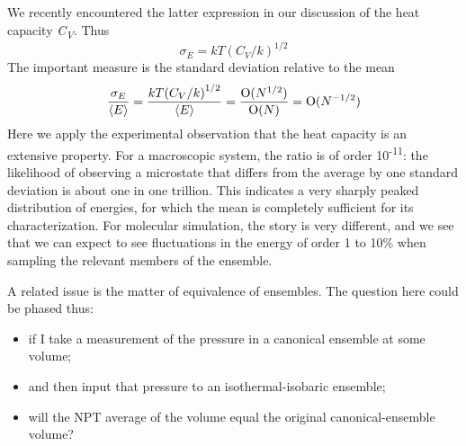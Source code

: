 \documentclass[9pt,bestpractices]{molsim}
\begin{document}
We recently encountered the latter expression in our discussion of the
heat capacity \emph{C\textsubscript{V}}. Thus
\[{\sigma _E} = kT{({C_V}/k)^{1/2}}\]
The important measure is the standard deviation relative to the mean
\[\frac{{{\sigma _E}}}{{\left\langle E \right\rangle }} = \frac{{kT{{({C_V}/k)}^{1/2}}}}{{\left\langle E \right\rangle }} = \frac{{{\rm O}({N^{1/2}})}}{{{\rm O}(N)}} = {\rm O}({N^{ - 1/2}})\]
Here we apply the experimental observation that the heat capacity is an
extensive property. For a macroscopic system, the ratio is of order
10\textsuperscript{-11}: the likelihood of observing a microstate that
differs from the average by one standard deviation is about one in one
trillion. This indicates a very sharply peaked distribution of energies,
for which the mean is completely sufficient for its characterization.
For molecular simulation, the story is very different, and we see that
we can expect to see fluctuations in the energy of order 1 to 10\% when
sampling the relevant members of the ensemble. 

A related issue is the matter of equivalence of ensembles. The question
here could be phased thus:

\begin{itemize}
\item
  if I take a measurement of the pressure in a canonical ensemble at
  some volume;
\item
  and then input that pressure to an isothermal-isobaric ensemble;
\item
  will the NPT average of the volume equal the original
  canonical-ensemble volume?
\end{itemize}
\end{document}
